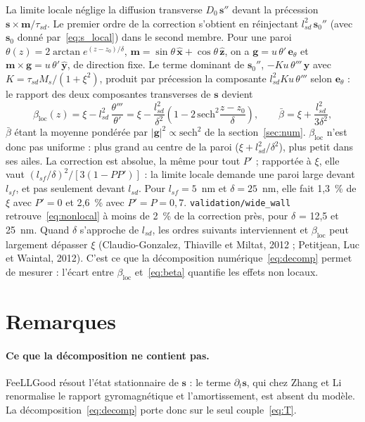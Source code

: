 \documentclass[11pt,a4paper]{article}
\newcommand{\vm}{\bm{m}}
\newcommand{\vs}{\bm{s}}
\newcommand{\vg}{\bm{g}}
\newcommand{\code}[1]{\texttt{#1}}
\begin{document}
La limite locale néglige la diffusion transverse $D_0\,\vs''$ devant la précession
$\vs\times\vm/\tau_{sd}$. Le premier ordre de la correction s'obtient en réinjectant
$l_{sd}^2\,\vs_0''$ (avec $\vs_0$ donné par~\eqref{eq:s_local}) dans le second membre. Pour une
paroi $\theta(z) = 2\arctan e^{(z-z_0)/\delta}$, $\vm = \sin\theta\,\hat{\bm x} +
\cos\theta\,\hat{\bm z}$, on a $\vg = u\,\theta'\,\bm e_\theta$ et
$\vm\times\vg = u\,\theta'\,\hat{\bm y}$, de direction fixe. Le terme dominant de
$\vs_0''$, $-K u\,\theta'''\,\hat{\bm y}$ avec $K = \tau_{sd}M_s/(1+\xi^2)$, produit par
précession la composante $l_{sd}^2 K u\,\theta'''$ selon $\bm e_\theta$ : le rapport des deux
composantes transverses de $\vs$ devient
\begin{equation}
  \beta_{\text{loc}}(z) = \xi - l_{sd}^2\,\frac{\theta'''}{\theta'}
  = \xi - \frac{l_{sd}^2}{\delta^2}\left(1 - 2\,\mathrm{sech}^2\frac{z-z_0}{\delta}\right),
  \qquad
  \bar\beta = \xi + \frac{l_{sd}^2}{3\delta^2},
  \label{eq:nonlocal}
\end{equation}
$\bar\beta$ étant la moyenne pondérée par $|\vg|^2\propto\mathrm{sech}^2$ de la
section~\ref{sec:num}. $\beta_{\text{loc}}$ n'est donc pas uniforme : plus grand au centre de la
paroi ($\xi + l_{sd}^2/\delta^2$), plus petit dans ses ailes. La correction est absolue, la même
pour tout $P'$ ; rapportée à $\xi$, elle vaut $(l_{sf}/\delta)^2/[3(1-PP')]$ : la limite locale
demande une paroi large devant $l_{sf}$, et pas seulement devant $l_{sd}$. Pour $l_{sf} = 5$~nm et
$\delta = 25$~nm, elle fait 1,3~\% de $\xi$ avec $P'=0$ et 2,6~\% avec $P'=P=0{,}7$.
\code{validation/wide\_wall} retrouve~\eqref{eq:nonlocal} à moins de 2~\% de la correction près,
pour $\delta$ = 12,5 et 25~nm. Quand $\delta$ s'approche de $l_{sd}$, les ordres suivants
interviennent et $\beta_{\text{loc}}$ peut largement dépasser $\xi$ (Claudio-Gonzalez, Thiaville et
Miltat, 2012 ; Petitjean, Luc et Waintal, 2012). C'est ce que la décomposition
numérique~\eqref{eq:decomp} permet de mesurer : l'écart entre $\beta_{\text{loc}}$
et~\eqref{eq:beta} quantifie les effets non locaux.

\section{Remarques}

\paragraph{Ce que la décomposition ne contient pas.} FeeLLGood résout l'état stationnaire de
$\vs$ : le terme $\partial_t\vs$, qui chez Zhang et Li renormalise le rapport gyromagnétique et
l'amortissement, est absent du modèle. La décomposition~\eqref{eq:decomp} porte donc sur le seul
couple~\eqref{eq:T}.
\end{document}
